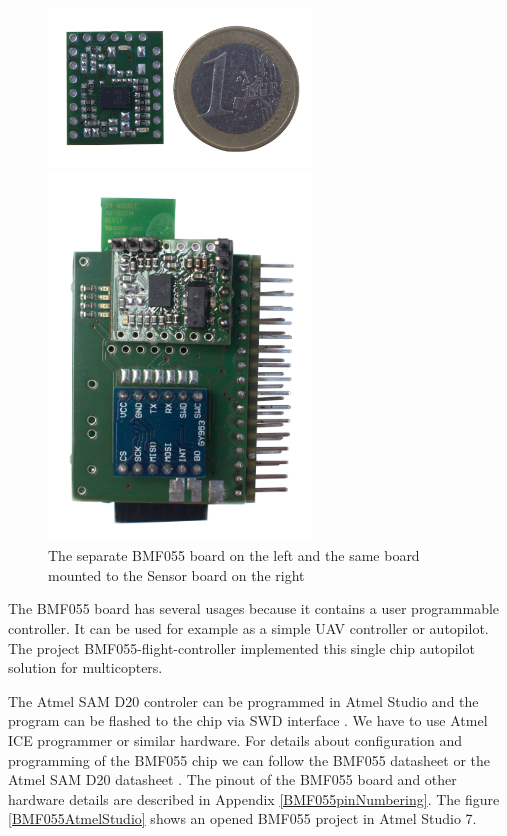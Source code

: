 \begin{figure}
	\centering
	\label{BMF055photo}
	\caption{The separate BMF055 board on the left and the same board mounted to the Sensor board on the right}
	\begin{minipage}[c]{.45\textwidth}
		\includegraphics[width=7cm]{img/BMF055.jpg}
	\end{minipage}
	\quad\vrule{}
	\begin{minipage}[c]{.45\textwidth}
		\includegraphics[width=7cm]{img/HWassembledNoCoin.jpg}
	\end{minipage}
\end{figure}

The BMF055 board has several usages because it contains a user programmable controller. It can be used for example as a simple UAV controller or autopilot. The project BMF055-flight-controller \cite{BMF055flightController} implemented this single chip autopilot solution for multicopters.

The Atmel SAM D20 controler \cite{atmel:samd20} can be programmed in Atmel Studio \cite{AtmelStudio} and the program can be flashed to the chip via \ac{SWD} interface \cite{SWDinterface}. We have to use Atmel ICE programmer \cite{AtmelICE} or similar hardware. For details about configuration and programming of the BMF055 chip we can follow the BMF055 datasheet \cite{bosch:BMF055} or the Atmel SAM D20 datasheet \cite{atmel:samd20}. The pinout of the BMF055 board and other hardware details are described in Appendix \ref{BMF055pinNumbering}. The figure \ref{BMF055AtmelStudio} shows an opened BMF055 project in Atmel Studio 7.

